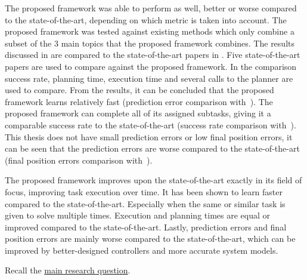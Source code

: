 The proposed framework was able to perform as well, better or worse compared to the state-of-the-art, depending on which metric is taken into account. The proposed framework was tested against existing methods which only combine a subset of the 3 main topics that the proposed framework combines. 
The results discussed in  are compared to the state-of-the-art papers in . Five state-of-the-art papers are used to compare against the proposed framework. In the comparison success rate, planning time, execution time and several calls to the planner are used to compare. From the results, it can be concluded that the proposed framework learns relatively fast (prediction error comparison with~\cite{wang_affordancebased_2020}). The proposed framework can complete all of its assigned subtasks, giving it a comparable success rate to the state-of-the-art (success rate comparison with~\cite{ellis_navigation_2022}). This thesis does not have small prediction errors or low final position errors, it can be seen that the prediction errors are worse compared to the state-of-the-art (final position errors comparison with~\cite{sabbaghnovin_model_2021}). \bs

The proposed framework improves upon the state-of-the-art exactly in its field of focus, improving task execution over time. It has been shown to learn faster compared to the state-of-the-art. Especially when the same or similar task is given to solve multiple times. Execution and planning times are equal or improved compared to the state-of-the-art. Lastly, prediction errors and final position errors are mainly worse compared to the state-of-the-art, which can be improved by better-designed controllers and more accurate system models. 


Recall the \hyperref[researchquestion:main]{main research question}. \vspace{0.5\baselineskip}\\
\textit{\indent{}}\vspace{\baselineskip}

